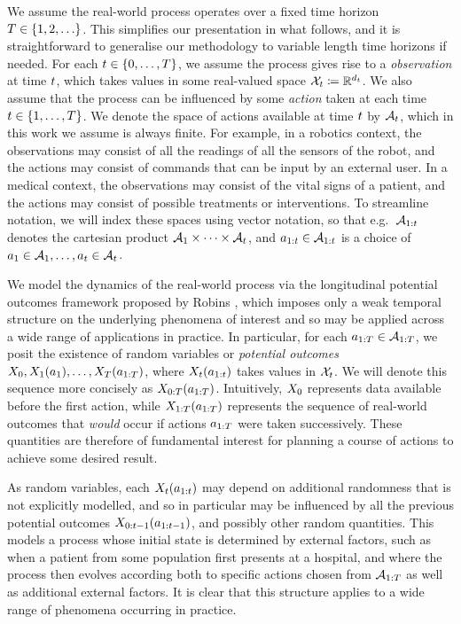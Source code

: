 We assume the real-world process operates over a fixed time horizon $T \in \{1, 2, \ldots\}$.
This simplifies our presentation in what follows, and it is straightforward to generalise our methodology to variable length time horizons if needed.
For each $t \in \{0, \ldots, T\}$, we assume the process gives rise to a \emph{observation} at time $t$, which takes values in some real-valued space $\mathcal{X}_t \coloneqq \mathbb{R}^{d_t}$.
%
We also assume that the process can be influenced by some \emph{action} taken at each time $t \in \{1, \ldots, T\}$.
We denote the space of actions available at time $t$ by $\mathcal{A}_t$, which in this work we assume is always finite.
For example, in a robotics context, the observations may consist of all the readings of all the sensors of the robot, and the actions may consist of commands that can be input by an external user.
In a medical context, the observations may consist of the vital signs of a patient, and the actions may consist of possible treatments or interventions.
To streamline notation, we will index these spaces using vector notation, so that e.g.\ $\mathcal{A}_{1:t}$ denotes the cartesian product $\mathcal{A}_1 \times \cdots \times \mathcal{A}_t$, and $a_{1:t} \in \mathcal{A}_{1:t}$ is a choice of $a_1 \in \mathcal{A}_1, \ldots, a_t \in \mathcal{A}_t$.

We model the dynamics of the real-world process via the longitudinal potential outcomes framework proposed by Robins \cite{robins1986new}, which imposes only a weak temporal structure on the underlying phenomena of interest and so may be applied across a wide range of applications in practice.
In particular, for each $a_{1:T} \in \mathcal{A}_{1:T}$, we posit the existence of random variables or \emph{potential outcomes} $X_0, X_1(a_1), \ldots, X_T(a_{1:T})$, where $X_t(a_{1:t})$ takes values in $\mathcal{X}_t$.
We will denote this sequence more concisely as $X_{0:T}(a_{1:T})$.
%
Intuitively, $X_0$ represents data available before the first action, while $X_{1:T}(a_{1:T})$ represents the sequence of real-world outcomes that \emph{would} occur if actions $a_{1:T}$ were taken successively.
These quantities are therefore of fundamental interest for planning a course of actions to achieve some desired result.

%

As random variables, each $X_{t}(a_{1:t})$ may depend on additional randomness that is not explicitly modelled, and so in particular may be influenced by all the previous potential outcomes $X_{0:t-1}(a_{1:t-1})$, and possibly other random quantities.
This models a process whose initial state is determined by external factors, such as when a patient from some population first presents at a hospital, and where the process then evolves according both to specific actions chosen from $\mathcal{A}_{1:T}$ as well as additional external factors.
It is clear that this structure applies to a wide range of phenomena occurring in practice.

